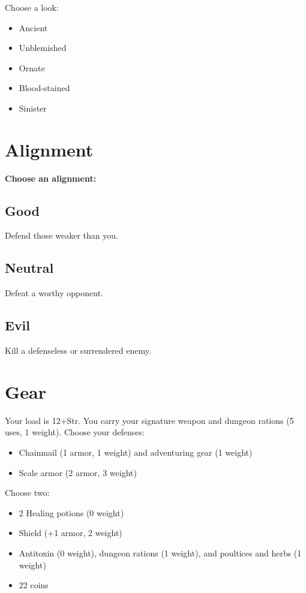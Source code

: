 Choose a look:
\begin{itemize}
\item Ancient
\item Unblemished
\item Ornate
\item Blood-stained
\item Sinister

\end{itemize}
\section*{Alignment}

{\bfseries Choose an alignment:}
\subsection{Good}

Defend those weaker than you.
\subsection{Neutral}

Defeat a worthy opponent.
\subsection{Evil}

Kill a defenseless or surrendered enemy.
\section*{Gear}

Your load is 12+Str. You carry your signature weapon and dungeon rations (5 uses, 1 weight). Choose your defenses:
\begin{itemize}
\item Chainmail (1 armor, 1 weight) and adventuring gear (1 weight)
\item Scale armor (2 armor, 3 weight)

\end{itemize}

Choose two:
\begin{itemize}
\item 2 Healing potions (0 weight)
\item Shield (+1 armor, 2 weight)
\item Antitoxin (0 weight), dungeon rations (1 weight), and poultices and herbs (1 weight)
\item 22 coins

\end{itemize}
